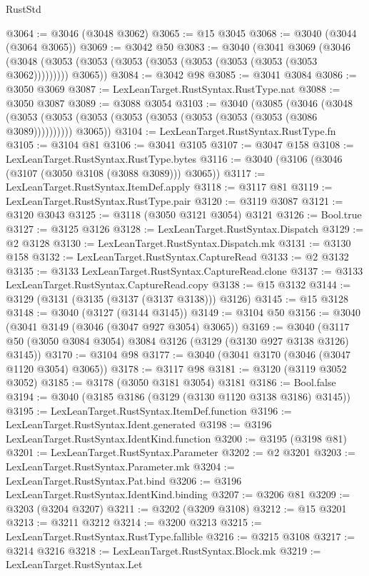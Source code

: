 \begin{lexlean}{RustStd}
\begin{coremodule}
@3064 := @3046 (@3048 @3062)
@3065 := @15 @3045
@3068 := @3040 (@3044 (@3064 @3065))
@3069 := @3042 @50
@3083 := @3040
    (@3041
      @3069
      (@3046 (@3048 (@3053 (@3053 (@3053 (@3053 (@3053 (@3053 (@3053 (@3053 @3062))))))))) @3065))
@3084 := @3042 @98
@3085 := @3041 @3084
@3086 := @3050 @3069
@3087 := LexLeanTarget.RustSyntax.RustType.nat
@3088 := @3050 @3087
@3089 := @3088 @3054
@3103 := @3040
    (@3085
      (@3046
        (@3048 (@3053 (@3053 (@3053 (@3053 (@3053 (@3053 (@3053 (@3053 (@3086 @3089))))))))))
        @3065))
@3104 := LexLeanTarget.RustSyntax.RustType.fn
@3105 := @3104 @81
@3106 := @3041 @3105
@3107 := @3047 @158
@3108 := LexLeanTarget.RustSyntax.RustType.bytes
@3116 := @3040 (@3106 (@3046 (@3107 (@3050 @3108 (@3088 @3089))) @3065))
@3117 := LexLeanTarget.RustSyntax.ItemDef.apply
@3118 := @3117 @81
@3119 := LexLeanTarget.RustSyntax.RustType.pair
@3120 := @3119 @3087
@3121 := @3120 @3043
@3125 := @3118 (@3050 @3121 @3054) @3121
@3126 := Bool.true
@3127 := @3125 @3126
@3128 := LexLeanTarget.RustSyntax.Dispatch
@3129 := @2 @3128
@3130 := LexLeanTarget.RustSyntax.Dispatch.mk
@3131 := @3130 @158
@3132 := LexLeanTarget.RustSyntax.CaptureRead
@3133 := @2 @3132
@3135 := @3133 LexLeanTarget.RustSyntax.CaptureRead.clone
@3137 := @3133 LexLeanTarget.RustSyntax.CaptureRead.copy
@3138 := @15 @3132
@3144 := @3129 (@3131 (@3135 (@3137 (@3137 @3138))) @3126)
@3145 := @15 @3128
@3148 := @3040 (@3127 (@3144 @3145))
@3149 := @3104 @50
@3156 := @3040 (@3041 @3149 (@3046 (@3047 @927 @3054) @3065))
@3169 := @3040 (@3117 @50 (@3050 @3084 @3054) @3084 @3126 (@3129 (@3130 @927 @3138 @3126) @3145))
@3170 := @3104 @98
@3177 := @3040 (@3041 @3170 (@3046 (@3047 @1120 @3054) @3065))
@3178 := @3117 @98
@3181 := @3120 (@3119 @3052 @3052)
@3185 := @3178 (@3050 @3181 @3054) @3181
@3186 := Bool.false
@3194 := @3040 (@3185 @3186 (@3129 (@3130 @1120 @3138 @3186) @3145))
@3195 := LexLeanTarget.RustSyntax.ItemDef.function
@3196 := LexLeanTarget.RustSyntax.Ident.generated
@3198 := @3196 LexLeanTarget.RustSyntax.IdentKind.function
@3200 := @3195 (@3198 @81)
@3201 := LexLeanTarget.RustSyntax.Parameter
@3202 := @2 @3201
@3203 := LexLeanTarget.RustSyntax.Parameter.mk
@3204 := LexLeanTarget.RustSyntax.Pat.bind
@3206 := @3196 LexLeanTarget.RustSyntax.IdentKind.binding
@3207 := @3206 @81
@3209 := @3203 (@3204 @3207)
@3211 := @3202 (@3209 @3108)
@3212 := @15 @3201
@3213 := @3211 @3212
@3214 := @3200 @3213
@3215 := LexLeanTarget.RustSyntax.RustType.fallible
@3216 := @3215 @3108
@3217 := @3214 @3216
@3218 := LexLeanTarget.RustSyntax.Block.mk
@3219 := LexLeanTarget.RustSyntax.Let

\end{coremodule}
\end{lexlean}
